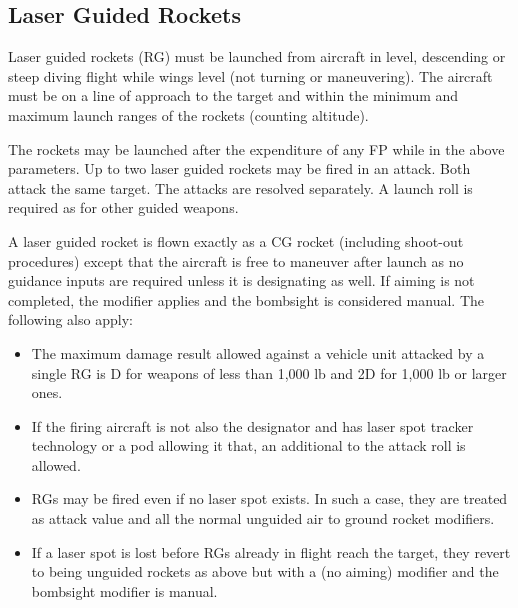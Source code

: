 \subsection{Laser Guided Rockets} Laser guided rockets (RG) must be launched from aircraft in level, descending or steep diving flight while wings level (not turning or maneuvering). The aircraft must be on a line of approach to the target and within the minimum and maximum launch ranges of the rockets (counting altitude).

The rockets may be launched after the expenditure of any FP while in the above parameters. Up to two laser guided rockets may be fired in an attack. Both attack the same target. The attacks are resolved separately. A launch roll is required as for other guided weapons.

A laser guided rocket is flown exactly as a CG rocket (including shoot-out procedures) except that the aircraft is free to maneuver after launch as no guidance inputs are required unless it is designating as well. If aiming is not completed, the  modifier applies and the bombsight is considered manual. The following also apply:

\begin{itemize}

\item The maximum damage result allowed against a vehicle unit attacked by a single RG is D for weapons of less than 1,000 lb and 2D for 1,000 lb or larger ones.

\item If the firing aircraft is not also the designator and has laser spot tracker technology or a pod allowing it that, an additional  to the attack roll is allowed.

\item RGs may be fired even if no laser spot exists. In such a case, they are treated as  attack value and all the normal unguided air to ground rocket modifiers.

\item If a laser spot is lost before RGs already in flight reach the target, they revert to being unguided rockets as above but with a  (no aiming) modifier and the bombsight modifier is manual.

\end{itemize}
